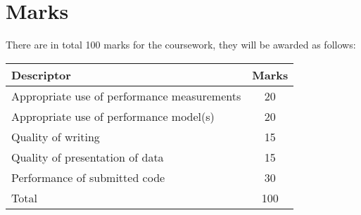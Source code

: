 \documentclass[a4paper]{article}
\begin{document}
\section{Marks}
\label{sec:marks}

There are in total 100 marks for the coursework, they
will be awarded as follows:

\begin{center}
  \renewcommand\tabularxcolumn[1]{m{#1}}
  \begin{tabularx}{0.9\linewidth}{Xc}
    \toprule
    Descriptor                                                  & Marks \\
    \midrule
    Appropriate use of performance measurements                 & 20    \\
    Appropriate use of performance model(s)                     & 20    \\
    Quality of writing                                          & 15    \\
    Quality of presentation of data                             & 15    \\
    \midrule
    Performance of submitted code                               & 30    \\
    \midrule
    Total                                                       & 100   \\
    \bottomrule
  \end{tabularx}
\end{center}

\printbibliography
\end{document}
